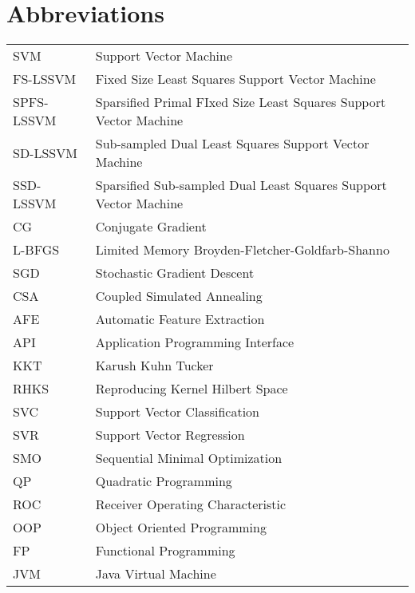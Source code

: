 \documentclass[master=mai,masteroption=ecs]{kulemt}
\begin{document}
\section*{Abbreviations}
\begin{flushleft}
  \renewcommand{\arraystretch}{1.1}
  \begin{tabularx}{\textwidth}{@{}p{12mm}X@{}}
    SVM   & Support Vector Machine \\
    FS-LSSVM   & Fixed Size Least Squares Support Vector Machine \\
    SPFS-LSSVM & Sparsified Primal FIxed Size Least Squares Support Vector Machine\\
    SD-LSSVM & Sub-sampled Dual Least Squares Support Vector Machine\\
    SSD-LSSVM & Sparsified Sub-sampled Dual Least Squares Support Vector Machine\\
    CG   & Conjugate Gradient \\
    L-BFGS & Limited Memory Broyden-Fletcher-Goldfarb-Shanno\\
    SGD & Stochastic Gradient Descent\\
    CSA  & Coupled Simulated Annealing \\
    AFE  & Automatic Feature Extraction \\
    API  & Application Programming Interface \\ 
    KKT  & Karush Kuhn Tucker \\
    RHKS & Reproducing Kernel Hilbert Space\\
    SVC & Support Vector Classification\\
    SVR & Support Vector Regression\\
    SMO & Sequential Minimal Optimization\\
    QP & Quadratic Programming\\
    ROC & Receiver Operating Characteristic\\
    OOP & Object Oriented Programming\\
    FP & Functional Programming\\
    JVM & Java Virtual Machine\\
  \end{tabularx}
\end{flushleft}
\end{document}
